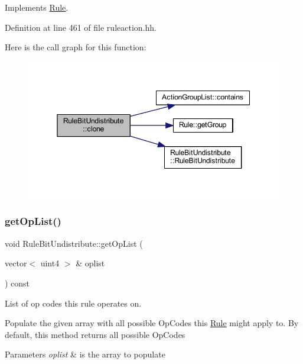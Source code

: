 Implements \mbox{\hyperlink{class_rule_a70de90a76461bfa7ea0b575ce3c11e4d}{Rule}}.



Definition at line 461 of file ruleaction.\+hh.

Here is the call graph for this function\+:
\nopagebreak
\begin{figure}[H]
\begin{center}
\leavevmode
\includegraphics[width=345pt]{class_rule_bit_undistribute_a496c93a2aad0d79a776a71160529d830_cgraph}
\end{center}
\end{figure}
\mbox{\label{class_rule_bit_undistribute_ab8b99b7595b2533bde19beab4391a300}} 
\subsubsection{\texorpdfstring{getOpList()}{getOpList()}}
{\footnotesize\ttfamily void Rule\+Bit\+Undistribute\+::get\+Op\+List (\begin{DoxyParamCaption}\item[{vector$<$ uint4 $>$ \&}]{oplist }\end{DoxyParamCaption}) const\hspace{0.3cm}{\ttfamily [virtual]}}



List of op codes this rule operates on. 

Populate the given array with all possible Op\+Codes this \mbox{\hyperlink{class_rule}{Rule}} might apply to. By default, this method returns all possible Op\+Codes 
\begin{DoxyParams}{Parameters}
{\em oplist} & is the array to populate \\
\hline
\end{DoxyParams}


